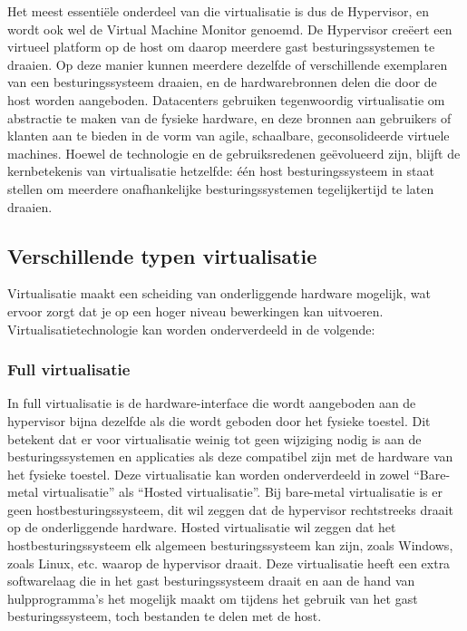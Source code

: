 Het meest essentiële onderdeel van die virtualisatie is dus de Hypervisor, en wordt ook wel de Virtual Machine Monitor genoemd. De Hypervisor creëert een virtueel platform op de host om daarop meerdere gast besturingssystemen te draaien. Op deze manier kunnen meerdere dezelfde of verschillende exemplaren van een besturingssysteem draaien, en de hardwarebronnen delen die door de host worden aangeboden. Datacenters gebruiken tegenwoordig virtualisatie om abstractie te maken van de fysieke hardware, en deze bronnen aan gebruikers of klanten aan te bieden in de vorm van agile, schaalbare, geconsolideerde virtuele machines. Hoewel de technologie en de gebruiksredenen geëvolueerd zijn, blijft de kernbetekenis van virtualisatie hetzelfde: één host besturingssysteem in staat stellen om meerdere onafhankelijke besturingssystemen tegelijkertijd te laten draaien. \autocite{Oracle2012} 

\subsection{Verschillende typen virtualisatie}

Virtualisatie maakt een scheiding van onderliggende hardware mogelijk, wat ervoor zorgt dat je op een hoger niveau bewerkingen kan uitvoeren. Virtualisatietechnologie kan worden onderverdeeld in de volgende: 

\subsubsection{Full virtualisatie}

In full virtualisatie is de hardware-interface die wordt aangeboden aan de hypervisor bijna dezelfde als die wordt geboden door het fysieke toestel. Dit betekent dat er voor virtualisatie weinig tot geen wijziging nodig is aan de besturingssystemen en applicaties als deze compatibel zijn met de hardware van het fysieke toestel. Deze virtualisatie kan worden onderverdeeld in zowel “Bare-metal virtualisatie” als “Hosted virtualisatie”. Bij bare-metal virtualisatie is er geen hostbesturingssysteem, dit wil zeggen dat de hypervisor rechtstreeks draait op de onderliggende hardware. Hosted virtualisatie wil zeggen dat het hostbesturingssysteem elk algemeen besturingssysteem kan zijn, zoals Windows, zoals Linux, etc. waarop de hypervisor draait. Deze virtualisatie heeft een extra softwarelaag die in het gast besturingssysteem draait en aan de hand van hulpprogramma's het mogelijk maakt om tijdens het gebruik van het gast besturingssysteem, toch bestanden te delen met de host. \autocite{Kedia2013}

